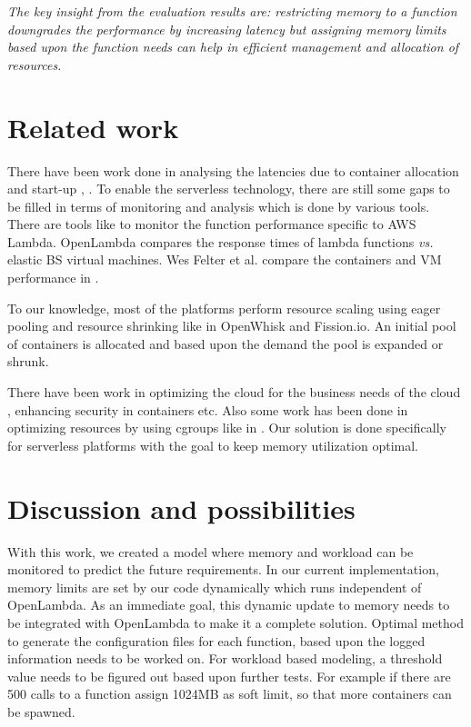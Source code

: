 \documentclass[letterpaper,twocolumn,10pt]{article}
\begin{document}
\textit{The key insight from the evaluation results are: restricting memory to a function downgrades the performance by increasing  latency but assigning memory limits based upon the function needs can help in efficient management and allocation of resources.} 





\section{Related work}
\label{sec:fourth}
There have been work done in analysing the latencies due to container allocation and start-up \cite{mcgrath.wp}, \cite{scalecon}. To enable the serverless technology, there are still some gaps to be filled in terms of monitoring and analysis which is done by various tools. There are tools like \cite{iopipe} to monitor the function performance specific to AWS Lambda. OpenLambda \cite{openlambda.wp} compares the response times of lambda functions \textit{vs.} elastic BS\cite{awsbs} virtual machines. Wes Felter et al. compare the containers and VM performance in \cite{vmcon}.

To our knowledge, most of the platforms perform resource scaling using eager pooling and resource shrinking like in OpenWhisk\cite{whisk} and Fission.io\cite{fission}. An initial pool of containers is allocated and based upon the demand the pool is expanded or shrunk.

There have been work in optimizing the cloud for the business needs of the cloud \cite{Litoiu}, enhancing security in containers \cite{docksec} etc. Also some work has been done in optimizing resources by using cgroups like in \cite{rtrm}. Our solution is done specifically for serverless platforms with the goal to keep memory utilization optimal.

\section{Discussion and possibilities}
\label{sec:fifth}

With this work, we created a model where memory and workload can be monitored to predict the future requirements. In our current implementation, memory limits are set by our code dynamically which runs independent of OpenLambda. As an immediate goal, this dynamic update to memory needs to be integrated with OpenLambda to make it a complete solution. Optimal method to generate the configuration files for each function, based upon the logged information needs to be worked on. For workload based modeling, a threshold value needs to be figured out based upon further tests. For example if there are 500 calls to a function assign 1024MB as soft limit, so that more containers can be spawned.
\end{document}
